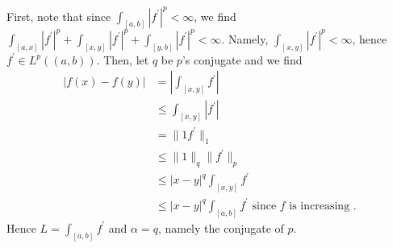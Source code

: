 \documentclass[a4paper]{article}
\begin{document}
\newpage
\begin{problem}[44]
	First, note that since \(\int_{\left[ a, b \right] } \left| f^{\prime} \right| ^{p} < \infty\), we find \(\int_{\left[ a, x \right] } \left| f^{\prime} \right| ^{p} + \int_{\left[ x, y \right] } \left| f^{\prime} \right| ^{p} + \int_{\left[ y, b \right] } \left| f^{\prime} \right|^{p} < \infty \). Namely, \(\int_{\left[ x, y \right] } \left| f^{\prime} \right| ^{p} < \infty\), hence \(f^{\prime} \in L^{p}\left( \left( a, b \right)  \right) \). Then, let \(q\) be \(p\)'s conjugate and we find
	\begin{align*}
		\left| f\left( x \right) - f\left( y \right)   \right| &= \left| \int_{\left[ x, y \right] } f^{\prime}  \right| \\
		&\le \int_{\left[ x, y \right] } \left| f^{\prime} \right|   \\
		&= \|1f^{\prime}\|_{1} \\
		&\le \|1\|_{q} \|f^{\prime}\|_{p}\\
		&\le \left| x - y \right|^{q} \int_{\left[ x, y \right] } f^{\prime}\\
		&\le \left| x - y \right|^{q} \int_{\left[ a, b \right] } f^{\prime} \text{ since \(f\) is increasing }
	.\end{align*}
	Hence \(L = \int_{\left[ a, b \right] }f^{\prime}\) and \(\alpha = q\), namely the conjugate of \(p\).
\end{problem}
\end{document}
